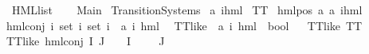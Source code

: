 %
\begin{isabellebody}%
%
%
\isadelimtheory
%
\endisadelimtheory
%
\isatagtheory
{}\isamarkupfalse%
\ HML{\isacharunderscore}{\kern0pt}list\isanewline
\ \ \isanewline
\ Main\isanewline
\ Transition{\isacharunderscore}{\kern0pt}Systems\isanewline
\isanewline
{}%
\endisatagtheory
{\isafoldtheory}%
%
\isadelimtheory
\isanewline
%
\endisadelimtheory
{}\isamarkupfalse%
\ {\isacharparenleft}{\kern0pt}{\isacharprime}{\kern0pt}a{\isacharcomma}{\kern0pt}\ {\isacharprime}{\kern0pt}i{\isacharparenright}{\kern0pt}hml\ {\isacharequal}{\kern0pt}\isanewline
TT\ {\isacharbar}{\kern0pt}\isanewline
hml{\isacharunderscore}{\kern0pt}pos\ {\isacartoucheopen}{\isacharprime}{\kern0pt}a{\isacartoucheclose}\ {\isacartoucheopen}{\isacharparenleft}{\kern0pt}{\isacharprime}{\kern0pt}a{\isacharcomma}{\kern0pt}\ {\isacharprime}{\kern0pt}i{\isacharparenright}{\kern0pt}hml{\isacartoucheclose}\ {\isacharbar}{\kern0pt}\isanewline
hml{\isacharunderscore}{\kern0pt}conj\ {\isachardoublequoteopen}{\isacharprime}{\kern0pt}i\ set{\isachardoublequoteclose}\ {\isachardoublequoteopen}{\isacharprime}{\kern0pt}i\ set{\isachardoublequoteclose}\ {\isachardoublequoteopen}{\isacharprime}{\kern0pt}i\ {\isasymRightarrow}\ {\isacharparenleft}{\kern0pt}{\isacharprime}{\kern0pt}a{\isacharcomma}{\kern0pt}\ {\isacharprime}{\kern0pt}i{\isacharparenright}{\kern0pt}\ hml{\isachardoublequoteclose}\ \isanewline
\isanewline
{}\isamarkupfalse%
\ TT{\isacharunderscore}{\kern0pt}like\ {\isacharcolon}{\kern0pt}{\isacharcolon}{\kern0pt}\ {\isachardoublequoteopen}{\isacharparenleft}{\kern0pt}{\isacharprime}{\kern0pt}a{\isacharcomma}{\kern0pt}\ {\isacharprime}{\kern0pt}i{\isacharparenright}{\kern0pt}\ hml\ {\isasymRightarrow}\ bool{\isachardoublequoteclose}\isanewline
\ \ \isanewline
{\isachardoublequoteopen}TT{\isacharunderscore}{\kern0pt}like\ TT{\isachardoublequoteclose}\ {\isacharbar}{\kern0pt}\isanewline
{\isachardoublequoteopen}TT{\isacharunderscore}{\kern0pt}like\ {\isacharparenleft}{\kern0pt}hml{\isacharunderscore}{\kern0pt}conj\ I\ J\ {\isasymPhi}{\isacharparenright}{\kern0pt}{\isachardoublequoteclose}\ \ {\isachardoublequoteopen}{\isacharparenleft}{\kern0pt}{\isasymPhi}\ {\isacharbackquote}{\kern0pt}I{\isacharparenright}{\kern0pt}\ {\isacharequal}{\kern0pt}\ {\isacharbraceleft}{\kern0pt}{\isacharbraceright}{\kern0pt}{\isachardoublequoteclose}\ {\isachardoublequoteopen}{\isacharparenleft}{\kern0pt}{\isasymPhi}\ {\isacharbackquote}{\kern0pt}\ J{\isacharparenright}{\kern0pt}\ {\isacharequal}{\kern0pt}\ {\isacharbraceleft}{\kern0pt}{\isacharbraceright}{\kern0pt}{\isachardoublequoteclose}\isanewline

\end{isabellebody}
